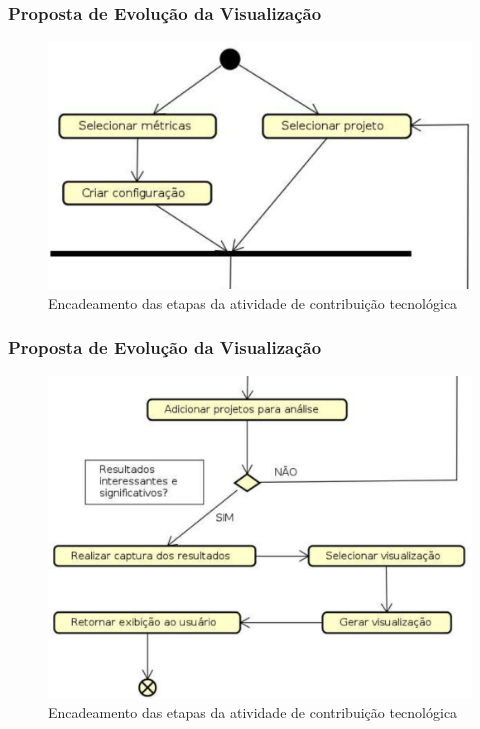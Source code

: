 \documentclass{beamer}
\begin{document}

\begin{frame}
\frametitle{Proposta de Evolução da Visualização}
\begin{figure}[!htb]
  \centering
    \includegraphics[keepaspectratio=true,scale=0.29]
    {../figuras/encadeamento_1.eps}
  \caption{Encadeamento das etapas da atividade de contribuição tecnológica}
  \label{fig:parallel}
\end{figure}
\end{frame}


\begin{frame}
\frametitle{Proposta de Evolução da Visualização}
\begin{figure}[!htb]
  \centering
    \includegraphics[keepaspectratio=true,scale=0.27]
    {../figuras/encadeamento_2.eps}
  \caption{Encadeamento das etapas da atividade de contribuição tecnológica}
  \label{fig:parallel}
\end{figure}
\end{frame}
\end{document}
